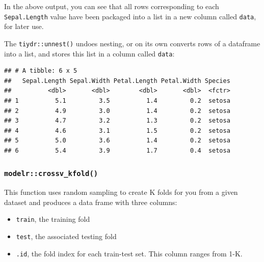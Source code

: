 \documentclass[]{article}
\newenvironment{Shaded}{\begin{snugshade}}{\end{snugshade}}
\newcommand{\KeywordTok}[1]{\textcolor[rgb]{0.13,0.29,0.53}{\textbf{#1}}}
\newcommand{\StringTok}[1]{\textcolor[rgb]{0.31,0.60,0.02}{#1}}
\newcommand{\OperatorTok}[1]{\textcolor[rgb]{0.81,0.36,0.00}{\textbf{#1}}}
\newcommand{\NormalTok}[1]{#1}
\providecommand{\tightlist}{%
  \setlength{\itemsep}{0pt}\setlength{\parskip}{0pt}}
\begin{document}
In the above output, you can see that all rows corresponding to each
\texttt{Sepal.Length} value have been packaged into a list in a new
column called \texttt{data}, for later use.

The \texttt{tiydr::unnest()} undoes nesting, or on its own converts rows
of a dataframe into a list, and stores this list in a column called
\texttt{data}:

\begin{Shaded}
\end{Shaded}

\begin{verbatim}
## # A tibble: 6 x 5
##   Sepal.Length Sepal.Width Petal.Length Petal.Width Species
##          <dbl>       <dbl>        <dbl>       <dbl>  <fctr>
## 1          5.1         3.5          1.4         0.2  setosa
## 2          4.9         3.0          1.4         0.2  setosa
## 3          4.7         3.2          1.3         0.2  setosa
## 4          4.6         3.1          1.5         0.2  setosa
## 5          5.0         3.6          1.4         0.2  setosa
## 6          5.4         3.9          1.7         0.4  setosa
\end{verbatim}

\subsubsection{\texorpdfstring{\texttt{modelr::crossv\_kfold()}}{modelr::crossv\_kfold()}}\label{modelrcrossv_kfold}

This function uses random sampling to create K folds for you from a
given dataset and produces a data frame with three columns:

\begin{itemize}
\tightlist
\item
  \texttt{train}, the training fold
\item
  \texttt{test}, the associated testing fold
\item
  \texttt{.id}, the fold index for each train-test set. This column
  ranges from 1-K.
\end{itemize}
\end{document}
